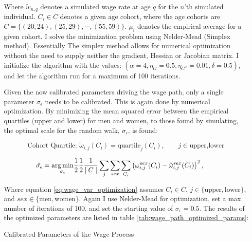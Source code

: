 Where $\tilde{w}_{n, q}$ denotes a simulated wage rate at age $q$ for the $n$'th simulated individual. $C_i \in C$ denotes a given age cohort, where the age cohorts are $C=\{(20, 24), (25, 29), \cdots , (55, 59) \}$. $\mu_i$ denotes the empirical average for a given cohort.
I solve the minimization problem using Nelder-Mead (Simplex method). Essentially The simplex method allows for numerical optimization without the need to supply neither the gradient, Hessian or Jacobian matrix. I initialize the algorithm with the values: $(\alpha=4, \eta_G = 0.5, \eta_{G^2}=0.01, \delta=0.5)$, and let the algorithm run for a maximum of 100 iterations. 

Given the now calibrated parameters driving the wage path, only a single parameter $\sigma_\epsilon$ needs to be calibrated. This is again done by numerical optimization. By minimizing the mean squared error between the empirical quartiles (upper and lower) for men and women, to those found by simulating, the optimal scale for the random walk, $\sigma_\epsilon$, is found:

\begin{equation}
    \text{Cohort Quartile: } {\tilde{\omega}}_{i, j} (C_i) = \text{quartile}_j (C_i), \qquad j\in{\text{upper}, \text{lower}} 
\end{equation}

\begin{equation}\label{eq:wage_var_optimization}
   \hat{\sigma_\epsilon}  = \underset{\sigma_\epsilon}{\operatorname*{arg\,min}} \frac{1}{2}\frac{1}{2}\frac{1}{\mid C \mid } \sum_{j} \sum_{sex}\sum_{C_i} \left( \omega_{i, j}^{sex}(C_i)  - \tilde{\omega}_{i,j}^{sex}(C_i)\right)^2, \qquad 
\end{equation}

Where equation \eqref{eq:wage_var_optimization} assumes $C_i \in C$, $j \in \{\text{upper},  \text{lower} \}$, and $sex \in \{\text{men}, \text{women} \}$. Again I use Nelder-Mead for optimization, set a max number of iterations of 100, and set the starting value of $\sigma_\epsilon = 0.5$. The results of the optimized parameters are listed in table \ref{tab:wage_path_optimized_params}:

\begin{table}[ht]
    \centering
    
    \caption{Calibrated Parameters of the Wage Process}
    \label{tab:wage_path_optimized_params}
\end{table}

